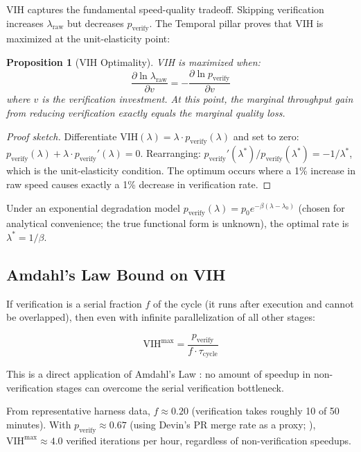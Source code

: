 \documentclass[11pt, a4paper, logo, copyright]{googledeepmind}
\newtheorem{proposition}{Proposition}[section]
\begin{document}
VIH captures the fundamental speed-quality tradeoff. Skipping verification increases $\lambda_{\text{raw}}$ but decreases $p_{\text{verify}}$. The Temporal pillar proves that VIH is maximized at the unit-elasticity point:

\begin{proposition}[VIH Optimality]
\label{prop:vih-optimal}
VIH is maximized when:
\begin{equation}
    \frac{\partial \ln \lambda_{\text{raw}}}{\partial v} = -\frac{\partial \ln p_{\text{verify}}}{\partial v}
\end{equation}
where $v$ is the verification investment. At this point, the marginal throughput gain from reducing verification exactly equals the marginal quality loss.
\end{proposition}

\begin{proof}[Proof sketch]
Differentiate $\text{VIH}(\lambda) = \lambda \cdot p_{\mathrm{verify}}(\lambda)$ and set to zero: $p_{\mathrm{verify}}(\lambda) + \lambda \cdot p_{\mathrm{verify}}'(\lambda) = 0$. Rearranging: $p_{\mathrm{verify}}'(\lambda^*)/p_{\mathrm{verify}}(\lambda^*) = -1/\lambda^*$, which is the unit-elasticity condition. The optimum occurs where a 1\% increase in raw speed causes exactly a 1\% decrease in verification rate.
\end{proof}

Under an exponential degradation model $p_{\mathrm{verify}}(\lambda) = p_0 e^{-\beta(\lambda - \lambda_0)}$ (chosen for analytical convenience; the true functional form is unknown), the optimal rate is $\lambda^* = 1/\beta$.

\subsection{Amdahl's Law Bound on VIH}

If verification is a serial fraction $f$ of the cycle (it runs after execution and cannot be overlapped), then even with infinite parallelization of all other stages:

\begin{equation}
    \text{VIH}^{\max} = \frac{p_{\text{verify}}}{f \cdot \tau_{\text{cycle}}}
\end{equation}

This is a direct application of Amdahl's Law \citep{amdahl1967validity}: no amount of speedup in non-verification stages can overcome the serial verification bottleneck.

From representative harness data, $f \approx 0.20$ (verification takes roughly 10 of 50 minutes). With $p_{\text{verify}} \approx 0.67$ (using Devin's PR merge rate as a proxy; \citealt{cognition2025devin}), $\text{VIH}^{\max} \approx 4.0$ verified iterations per hour, regardless of non-verification speedups.
\end{document}
